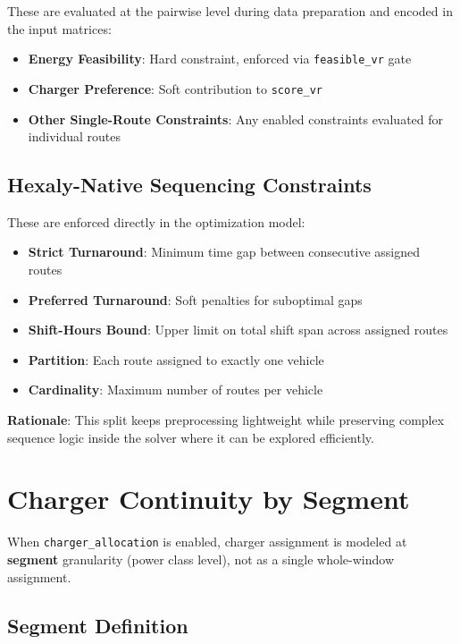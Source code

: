 \documentclass[11pt,a4paper]{article}
\begin{document}
These are evaluated at the pairwise level during data preparation and encoded in the input matrices:

\begin{itemize}
    \item \textbf{Energy Feasibility}: Hard constraint, enforced via \texttt{feasible\_vr} gate
    \item \textbf{Charger Preference}: Soft contribution to \texttt{score\_vr}
    \item \textbf{Other Single-Route Constraints}: Any enabled constraints evaluated for individual routes
\end{itemize}

\subsection{Hexaly-Native Sequencing Constraints}

These are enforced directly in the optimization model:

\begin{itemize}
    \item \textbf{Strict Turnaround}: Minimum time gap between consecutive assigned routes
    \item \textbf{Preferred Turnaround}: Soft penalties for suboptimal gaps
    \item \textbf{Shift-Hours Bound}: Upper limit on total shift span across assigned routes
    \item \textbf{Partition}: Each route assigned to exactly one vehicle
    \item \textbf{Cardinality}: Maximum number of routes per vehicle
\end{itemize}

\textbf{Rationale}: This split keeps preprocessing lightweight while preserving complex sequence logic inside the solver where it can be explored efficiently.

\section{Charger Continuity by Segment}

When \texttt{charger\_allocation} is enabled, charger assignment is modeled at \textbf{segment} granularity (power class level), not as a single whole-window assignment.

\subsection{Segment Definition}
\end{document}

